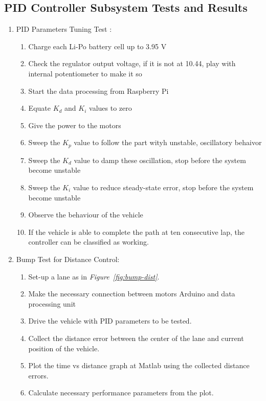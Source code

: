 \documentclass[a4paper,12pt]{article}
\begin{document}
\newpage
\subsection {PID Controller Subsystem Tests and Results}	

\begin{enumerate}
	
	
	
	\item PID Parameters Tuning Test :	 \label{test:a}	
	
	\begin{enumerate}
		\item Charge each Li-Po battery cell  up to 3.95 V
		\item Check the regulator output voltage, if it is not at 10.44, play with internal potentiometer to make it so  
		\item Start the data processing from Raspberry Pi
		\item Equate $K_d$ and $K_i$ values to zero
		\item Give the power to the motors  
		\item Sweep the $K_p$ value to follow the part wityh unstable, oscillatory behaivor
		\item Sweep the $K_d$ value to damp these oscillation, stop before the system become unstable
		\item Sweep the $K_i$ value to reduce steady-state error, stop before the system become unstable	
		\item Observe the behaviour of the vehicle  
		\item If the vehicle is able to complete the path at ten consecutive lap, the controller can be classified as working.  
	\end{enumerate}
	
	
	\item Bump Test for Distance Control: \label{test:b}	
	
	\begin{enumerate}
		\item Set-up a lane as in \textit{Figure~\ref{fig:bump-dist}}.
		\item Make the necessary connection between motors Arduino and data processing unit  
		\item Drive the vehicle with PID parameters to be tested.
		\item Collect the distance error between the center of the lane and current position of the vehicle.
		\item Plot the time vs distance graph at Matlab using the collected distance errors.
		\item Calculate necessary performance parameters from the plot.
	\end{enumerate}
	

\end{enumerate}
\end{document}
